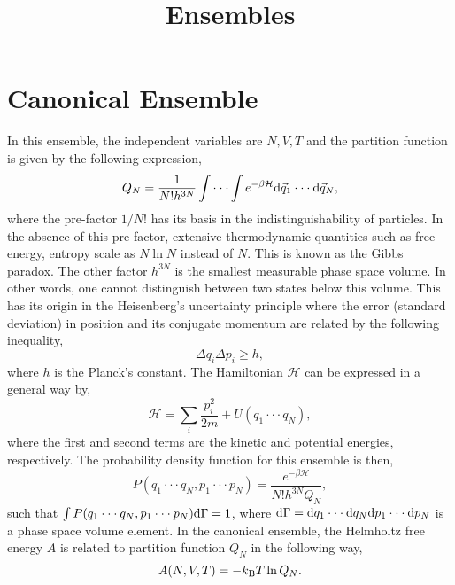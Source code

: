 \documentclass[a4paper]{article}
\title{Ensembles}
\date{}
\begin{document}
\maketitle
\section{Canonical Ensemble}
In this ensemble, the independent variables are $N,V,T$ and the partition function is given by the following expression,
\begin{equation}\label{eq:partitionfunction}
Q_{N}=\frac{1}{N!h^{3N}}\int\cdot\cdot\cdot\int e^{-\beta \mathcal{H}}{\rm d}\vec{q}_{1}\cdot\cdot\cdot{\rm d}\vec{q}_{N},
\end{equation}
where the pre-factor $1/N!$ has its basis in the indistinguishability  of particles. In the absence of this pre-factor, extensive thermodynamic quantities such as free energy, entropy scale as $N\ln{N}$ instead of $N$. This is known as the Gibbs paradox. The other factor $h^{3N}$ is the smallest measurable phase space volume. In other words, one cannot distinguish between two states below this volume. This has its origin in the Heisenberg's uncertainty principle where the error (standard deviation) in position and its conjugate momentum are related by the following inequality,
\begin{equation}
\Delta q_{i}\Delta p_{i} \geq h,
\end{equation}
where $h$ is the Planck's constant. The Hamiltonian $\mathcal{H}$ can be expressed in a general way by,
\begin{equation}
\mathcal{H}=\sum_{i}\frac{p_{i}^{2}}{2m} + U(q_{1}\cdot\cdot\cdot q_{N}),
\end{equation}
where the first and second terms are the kinetic and potential energies, respectively. The probability density function for this ensemble is then,
\begin{equation}
P(q_{1}\cdot\cdot\cdot q_{N},p_{1}\cdot\cdot\cdot p_{N})=\frac{e^{-\beta \mathcal{H}}}{N!h^{3N}Q_{N}},
\end{equation}
such that $\int P(q_{1}\cdot\cdot\cdot q_{N},p_{1}\cdot\cdot\cdot p_{N}){\rm d} \Gamma=1$, where ${\rm d} \Gamma={\rm d}q_{1}\cdot\cdot\cdot {\rm d}q_{N}{\rm d}p_{1}\cdot\cdot\cdot {\rm d}p_{N}$ is a phase space volume element. In the canonical ensemble, the Helmholtz free energy $A$ is related to partition function $Q_{N}$ in the following way,
\begin{equation}
A(N,V,T)=-k_{\rm B}T\ln{Q_{N}}.
\end{equation}
\end{document}
